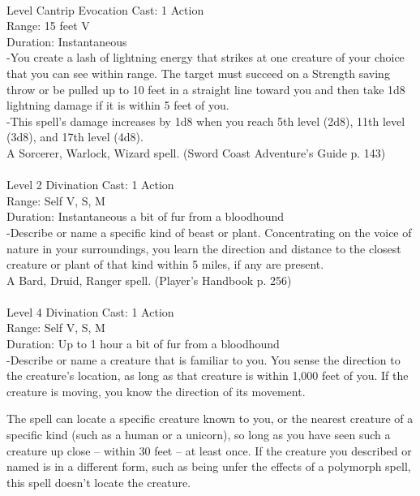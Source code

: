 \documentclass[10pt,twocolumn]{report}
\begin{document}
 \\
Level Cantrip \quad Evocation \quad Cast: 1 Action\\
Range: 15 feet \quad V\\
Duration: Instantaneous \quad \\
-You create a lash of lightning energy that strikes at one creature of your choice that you can see within range.
The target must succeed on a Strength saving throw or be pulled up to 10 feet in a straight line toward you and then take 1d8 lightning damage if it is within 5 feet of you.\\
-This spell's damage increases by 1d8 when you reach 5th level (2d8), 11th level (3d8), and 17th level (4d8).\\
A Sorcerer, Warlock, Wizard spell. (Sword Coast Adventure's Guide p. 143) \\


 \\
Level 2 \quad Divination \quad Cast: 1 Action\\
Range: Self \quad V, S, M\\
Duration: Instantaneous \quad a bit of fur from a bloodhound\\
-Describe or name a specific kind of beast or plant. Concentrating on the voice of nature in your surroundings, you learn the direction and distance to the closest creature or plant of that kind within 5 miles, if any are present.\\
A Bard, Druid, Ranger spell. (Player's Handbook p. 256) \\


 \\
Level 4 \quad Divination \quad Cast: 1 Action\\
Range: Self \quad V, S, M\\
Duration: Up to 1 hour \quad a bit of fur from a bloodhound\\
-Describe or name a creature that is familiar to you. You sense the direction to the creature’s location, as long as that creature is within 1,000 feet of you. If the creature is moving, you know the direction of its movement.

The spell can locate a specific creature known to you, or the nearest creature of a specific kind (such as a human or a unicorn), so long as you have seen such a creature up close – within 30 feet – at least once. If the creature you described or named is in a different form, such as being unfer the effects of a polymorph spell, this spell doesn’t locate the creature.
\end{document}
